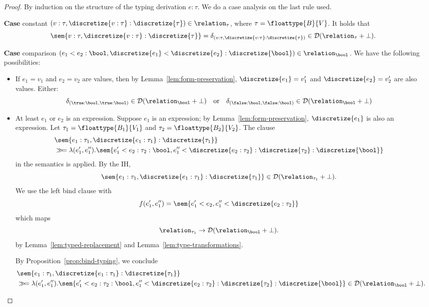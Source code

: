 \begin{proof}
	By induction on the structure of the typing derivation $e : \tau$. We do a case analysis on the last rule used.

	\textbf{Case} constant $(v : \tau, \discretize{v : \tau} : \discretize{\tau}) \in \relation_{\tau}$, where $\tau = \floattype{B}{V}$. It holds that 
	\[
		\sem{v : \tau, \discretize{v : \tau} : \discretize{\tau}} = \delta_{(v : \tau, \discretize{v : \tau} : \discretize{\tau})} \in \mathcal{D}(\relation_{\tau} + \bot).
	\]

	\textbf{Case} comparison $(e_1 < e_2 : \bool, \discretize{e_1} < \discretize{e_2} : \discretize{\bool}) \in \relation_{\bool}$. We have the following possibilities:
	\begin{itemize}
		\item If $e_1 = v_1$ and $e_2 = v_2$ are values, then by Lemma~\ref{lem:form-preservation}, $\discretize{e_1} = v_1'$ and $\discretize{e_2} = v_2'$ are also values. Either:
		\[
			\delta_{(\true:\bool, \true:\bool)} \in \mathcal{D}(\relation_{\bool} + \bot) 
			\quad\text{or}\quad
			\delta_{(\false:\bool, \false:\bool)} \in \mathcal{D}(\relation_{\bool} + \bot) 
		\]
		\item At least $e_1$ or $e_2$ is an expression. Suppose $e_1$ is an expression; by Lemma~\ref{lem:form-preservation}, $\discretize{e_1}$ is also an expression. Let $\tau_1 = \floattype{B_1}{V_1}$ and $\tau_2 = \floattype{B_2}{V_2}$. The clause
		\begin{align*}
			&\sem{ e_1 : \tau_1, \discretize{e_1 : \tau_1} : \discretize{\tau_1}} \\
			&\gg\!= \lambda (e_1',e_1''). \sem{ e_1' < e_2 : \tau_2 : \bool, e_1'' < \discretize{e_2 : \tau_2} : \discretize{\tau_2} : \discretize{\bool} }
		\end{align*}
		in the semantics is applied. By the IH,
		\[
			\sem{ e_1 : \tau_1, \discretize{e_1 : \tau_1} : \discretize{\tau_1}} \in \mathcal{D}(\relation_{\tau_1} + \bot).
		\]
		We use the left bind clause with 
		\[
			f(e_1',e_1'') = \sem{ e_1' < e_2, e_1'' < \discretize{e_2 : \tau_2}}
		\]
		which maps
		\[
			\relation_{\tau_1} \to \mathcal{D}(\relation_{\bool} + \bot).
		\]
		by Lemma~\ref{lem:typed-replacement} and Lemma~\ref{lem:type-transformations}.

		By Proposition~\ref{prop:bind-typing}, we conclude
		\begin{align*}
			&\sem{ e_1 : \tau_1, \discretize{e_1 : \tau_1} : \discretize{\tau_1}} \\
			&\gg\!= \lambda (e_1',e_1''). \sem{ e_1' < e_2 : \tau_2 : \bool, e_1'' < \discretize{e_2 : \tau_2} : \discretize{\tau_2} : \discretize{\bool} } \in \mathcal{D}(\relation_{\bool} + \bot).
		\end{align*}


\end{itemize}
\end{proof}
